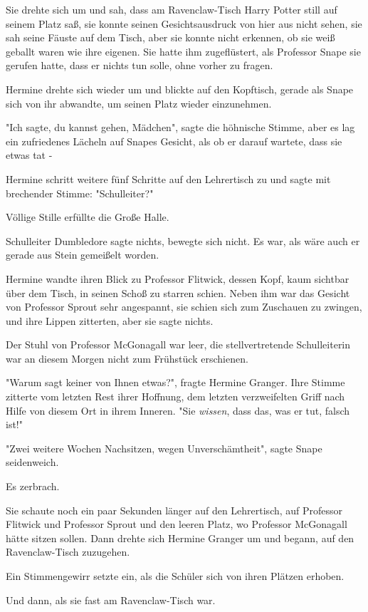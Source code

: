 {Sie drehte sich um und sah, dass am Ravenclaw-Tisch Harry Potter still auf seinem Platz saß, sie konnte seinen Gesichtsausdruck von hier aus nicht sehen, sie sah seine Fäuste auf dem Tisch, aber sie konnte nicht erkennen, ob sie weiß geballt waren wie ihre eigenen. Sie hatte ihm zugeflüstert, als Professor Snape sie gerufen hatte, dass er nichts tun solle, ohne vorher zu fragen.

Hermine drehte sich wieder um und blickte auf den Kopftisch, gerade als Snape sich von ihr abwandte, um seinen Platz wieder einzunehmen.

"Ich sagte, du kannst gehen, Mädchen", sagte die höhnische Stimme, aber es lag ein zufriedenes Lächeln auf Snapes Gesicht, als ob er darauf wartete, dass sie etwas tat -

Hermine schritt weitere fünf Schritte auf den Lehrertisch zu und sagte mit brechender Stimme: "Schulleiter?"

Völlige Stille erfüllte die Große Halle.

Schulleiter Dumbledore sagte nichts, bewegte sich nicht. Es war, als wäre auch er gerade aus Stein gemeißelt worden.

Hermine wandte ihren Blick zu Professor Flitwick, dessen Kopf, kaum sichtbar über dem Tisch, in seinen Schoß zu starren schien. Neben ihm war das Gesicht von Professor Sprout sehr angespannt, sie schien sich zum Zuschauen zu zwingen, und ihre Lippen zitterten, aber sie sagte nichts.

Der Stuhl von Professor McGonagall war leer, die stellvertretende Schulleiterin war an diesem Morgen nicht zum Frühstück erschienen.

"Warum sagt keiner von Ihnen etwas?", fragte Hermine Granger. Ihre Stimme zitterte vom letzten Rest ihrer Hoffnung, dem letzten verzweifelten Griff nach Hilfe von diesem Ort in ihrem Inneren. "Sie \emph{wissen}, dass das, was er tut, falsch ist!"

"Zwei weitere Wochen Nachsitzen, wegen Unverschämtheit", sagte Snape seidenweich.

Es zerbrach.

Sie schaute noch ein paar Sekunden länger auf den Lehrertisch, auf Professor Flitwick und Professor Sprout und den leeren Platz, wo Professor McGonagall hätte sitzen sollen. Dann drehte sich Hermine Granger um und begann, auf den Ravenclaw-Tisch zuzugehen.

Ein Stimmengewirr setzte ein, als die Schüler sich von ihren Plätzen erhoben.

Und dann, als sie fast am Ravenclaw-Tisch war.

}
